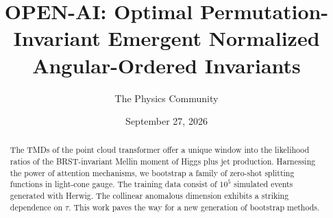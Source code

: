 \documentclass[11pt]{article}
\title{OPEN-AI: Optimal Permutation-Invariant Emergent Normalized Angular-Ordered Invariants}
\author{The Physics Community}
\date{September 27, 2026}
\numberwithin{equation}{section}
\theoremstyle{definition}
\theoremstyle{remark}
\begin{document}
\maketitle
\begin{abstract}
The TMDs of the point cloud transformer offer a unique window into the
likelihood ratios of the BRST-invariant Mellin moment of Higgs plus jet
production. Harnessing the power of attention mechanisms, we bootstrap a
family of zero-shot splitting functions in light-cone gauge. The
training data consist of $10^5$ simulated events generated with Herwig.
The collinear anomalous dimension exhibits a striking dependence on
$\tau$. This work paves the way for a new generation of bootstrap
methods.
\end{abstract}
\tableofcontents




\nocite{*}


\end{document}
